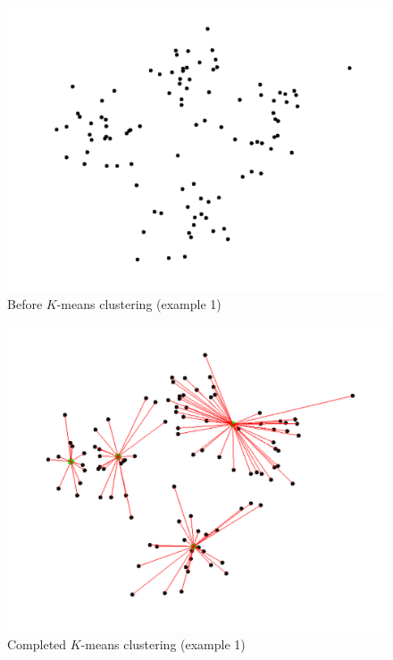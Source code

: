 \documentclass[a4paper]{article}
\begin{document}
\begin{figure}
\centering
\includegraphics[width=1.0\textwidth]{points.png}
\caption{\label{fig:kmeans_gif1}Before $K$-means clustering (example 1)}
\end{figure}

\begin{figure}
\centering
\includegraphics[width=1.0\textwidth]{points_done.png}
\caption{\label{fig:kmeans_gif2}Completed $K$-means clustering (example 1)}
\end{figure}
\end{document}
